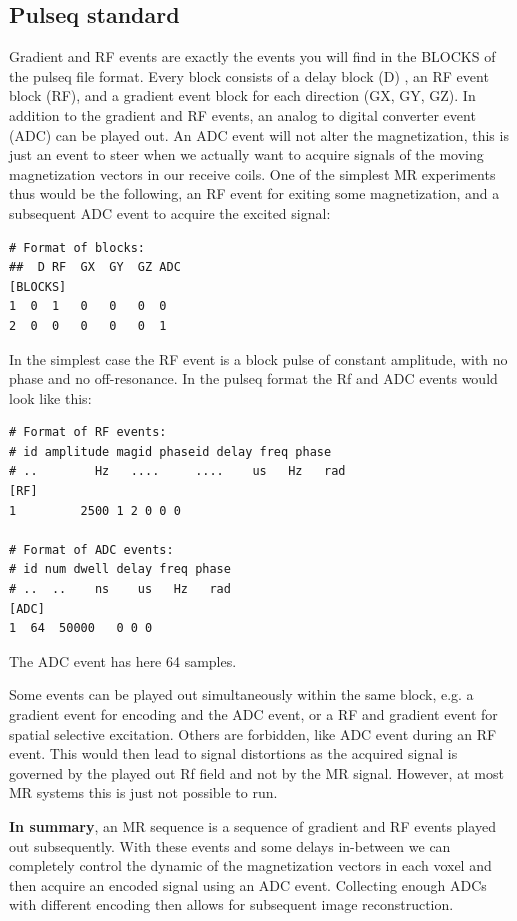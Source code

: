 \documentclass[a4paper,12pt]{extarticle}
\begin{document}
 
\subsection{ Pulseq standard}
Gradient and RF events are exactly the events you will find in the BLOCKS of the pulseq file format. Every block consists of a delay block (D) , an RF event block (RF), and a gradient event block for each direction (GX, GY, GZ). In addition to the gradient and RF events, an analog to digital converter event (ADC) can be played out. An ADC event will not alter the magnetization, this is just an event to steer when we actually want to acquire signals of the moving magnetization vectors in our receive coils. One of the simplest MR experiments thus would be the following,  an RF event for exiting some magnetization, and a subsequent ADC event to acquire the excited signal: 
\begin{lstlisting}
# Format of blocks:
##  D RF  GX  GY  GZ ADC
[BLOCKS]
1  0  1   0   0   0  0
2  0  0   0   0   0  1
\end{lstlisting}

In the simplest case the RF event is a block pulse of constant amplitude, with no phase and no off-resonance. In the pulseq format the Rf and ADC events would look like this:
\begin{lstlisting}
# Format of RF events:
# id amplitude magid phaseid delay freq phase
# ..        Hz   ....     ....    us   Hz   rad
[RF]
1         2500 1 2 0 0 0

# Format of ADC events:
# id num dwell delay freq phase
# ..  ..    ns    us   Hz   rad
[ADC]
1  64  50000   0 0 0
\end{lstlisting}
The ADC event has here 64 samples. 

Some events can be played out simultaneously within the same block, e.g. a gradient event for encoding and the ADC event, or a RF and gradient event for spatial selective excitation. Others are forbidden, like ADC event during an RF event. This would then lead to signal distortions as the acquired signal is governed by the played out Rf field and not by the MR signal. However, at most MR systems this is just not possible to run.


\textbf{In summary}, an MR sequence is a sequence of gradient and RF events played out subsequently. With these events and some delays in-between we can completely control the dynamic of the magnetization vectors in each voxel and then acquire an encoded signal using an ADC event. Collecting enough ADCs with different encoding then allows for subsequent image reconstruction.
\end{document}

